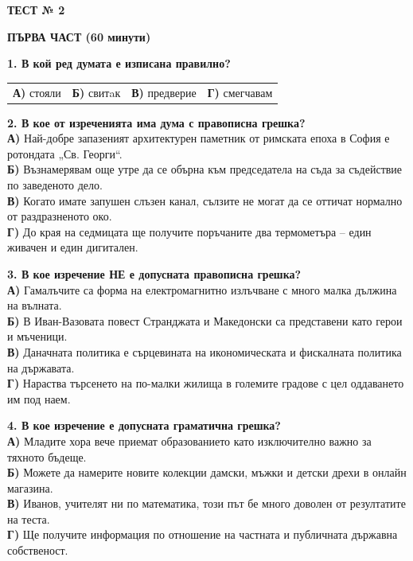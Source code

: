 \documentclass[12pt,a4paper]{article}
\begin{document}
\noindent
\begin{center}
  \textbf{ТЕСТ № 2}   
\end{center}

\vspace{0.2cm}
\noindent
\textbf{ПЪРВА ЧАСТ (60 минути)}

\vspace{0.4cm}

\noindent
\textbf{1. В кой ред думата е изписана правилно?} \\
\begin{tabular}{@{}p{} p{} p{} p{}@{}}
\textbf{А)} стояли & \textbf{Б)} свитaк & \textbf{В)} предверие & \textbf{Г)} смегчавам
\end{tabular}

\vspace{0.6cm}

\noindent
\textbf{2. В кое от изреченията има дума с правописна грешка?} \\
\textbf{А)} Най-добре запазеният архитектурен паметник от римската епоха в София е ротондата „Св. Георги“. \\
\textbf{Б)} Възнамерявам още утре да се обърна към председатела на съда за съдействие по заведеното дело. \\
\textbf{В)} Когато имате запушен слъзен канал, сълзите не могат да се оттичат нормално от раздразненото око. \\
\textbf{Г)} До края на седмицата ще получите поръчаните два термометъра – един живачен и един дигитален.

\vspace{0.6cm}

\noindent
\textbf{3. В кое изречение НЕ е допусната правописна грешка?} \\
\textbf{А)} Гамалъчите са форма на електромагнитно излъчване с много малка дължина на вълната. \\
\textbf{Б)} В Иван-Вазовата повест Странджата и Македонски са представени като герои и мъченици. \\
\textbf{В)} Даначната политика е сърцевината на икономическата и фискалната политика на държавата. \\
\textbf{Г)} Нараства търсенето на по-малки жилища в големите градове с цел оддаването им под наем.

\vspace{0.6cm}

\noindent
\textbf{4. В кое изречение е допусната граматична грешка?} \\
\textbf{А)} Младите хора вече приемат образованието като изключително важно за тяхното бъдеще. \\
\textbf{Б)} Можете да намерите новите колекции дамски, мъжки и детски дрехи в онлайн магазина. \\
\textbf{В)} Иванов, учителят ни по математика, този път бе много доволен от резултатите на теста. \\
\textbf{Г)} Ще получите информация по отношение на частната и публичната държавна собственост.
\end{document}
